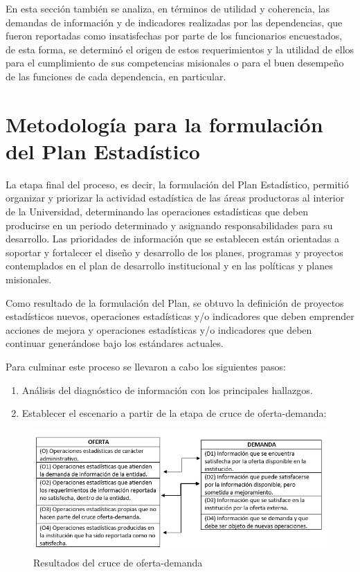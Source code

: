 \documentclass[
]{book}
\providecommand{\tightlist}{%
  \setlength{\itemsep}{0pt}\setlength{\parskip}{0pt}}
\begin{document}
En esta sección también se analiza, en términos de utilidad y coherencia, las demandas de
información y de indicadores realizadas por las dependencias, que fueron reportadas como
insatisfechas por parte de los funcionarios encuestados, de esta forma, se determinó el origen de
estos requerimientos y la utilidad de ellos para el cumplimiento de sus competencias misionales o
para el buen desempeño de las funciones de cada dependencia, en particular.

\hypertarget{metodologuxeda-para-la-formulaciuxf3n-del-plan-estaduxedstico}{%
\section{Metodología para la formulación del Plan Estadístico}\label{metodologuxeda-para-la-formulaciuxf3n-del-plan-estaduxedstico}}

La etapa final del proceso, es decir, la formulación del Plan Estadístico, permitió organizar y
priorizar la actividad estadística de las áreas productoras al interior de la Universidad, determinando
las operaciones estadísticas que deben producirse en un periodo determinado y asignando
responsabilidades para su desarrollo. Las prioridades de información que se establecen están
orientadas a soportar y fortalecer el diseño y desarrollo de los planes, programas y proyectos
contemplados en el plan de desarrollo institucional y en las políticas y planes misionales.

Como resultado de la formulación del Plan, se obtuvo la definición de proyectos estadísticos
nuevos, operaciones estadísticas y/o indicadores que deben emprender acciones de mejora y
operaciones estadísticas y/o indicadores que deben continuar generándose bajo los estándares
actuales.

Para culminar este proceso se llevaron a cabo los siguientes pasos:

\begin{enumerate}
\def\labelenumi{\alph{enumi}.}
\tightlist
\item
  Análisis del diagnóstico de información con los
  principales hallazgos.
\item
  Establecer el escenario a partir de la etapa de
  cruce de oferta-demanda:
\end{enumerate}

\begin{figure}

{\centering \includegraphics[width=0.8\linewidth]{Imagenes/ima1} 

}

\caption{Resultados del cruce de oferta-demanda}\label{fig:unnamed-chunk-2}
\end{figure}
\end{document}
